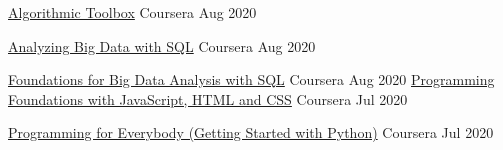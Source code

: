 

\begin{cvhonors}

  \cvhonor
    {\href{https://www.coursera.org/account/accomplishments/verify/XA4M467JLWLM}{Algorithmic Toolbox}} %
    {Coursera} %
    {Aug 2020} %
    {} %

  \cvhonor
    {\href{https://www.coursera.org/account/accomplishments/verify/SJL62UHXHRG2}{Analyzing Big Data with SQL}} %
    {Coursera} %
    {Aug 2020} %
    {} %

  \cvhonor
    {\href{https://www.coursera.org/account/accomplishments/verify/JWSBM68MAT2E}{Foundations for Big Data Analysis with SQL}} %
    {Coursera} %
    {Aug 2020} %
    {} %
  \cvhonor
    {\href{https://www.coursera.org/account/accomplishments/verify/STMNR7S223JG}{Programming Foundations with JavaScript, HTML and CSS}} %
    {Coursera} %
    {Jul 2020} %
    {} %

  \cvhonor
    {\href{https://www.coursera.org/account/accomplishments/verify/NRDHWEE7BERQ}{Programming for Everybody (Getting Started with Python)}} %
    {Coursera} %
    {Jul 2020} %
    {} %

\end{cvhonors}

